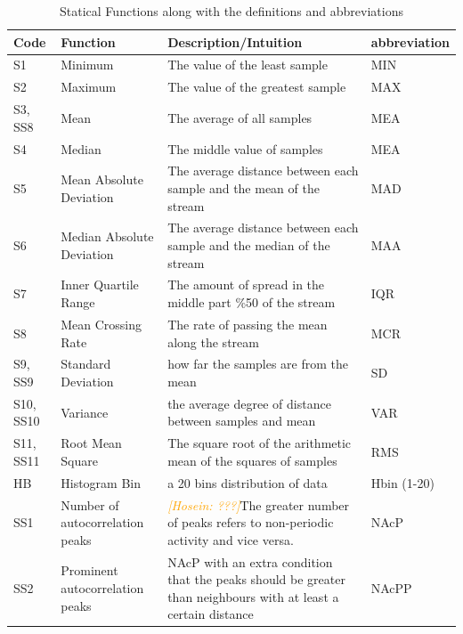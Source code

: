 \documentclass[journal,article,submit,moreauthors,pdftex]{Definitions/mdpi}
\newcommand{\hosein}[1]{\textcolor{orange}{{\it [Hosein: #1]}}}
\begin{document}
\begin{table}[H]
	\caption{Statical Functions along with the definitions and abbreviations }
	\centering
	\begin{tabular}{p{0.9cm}p{5cm}p{7cm}p{1.3cm}}
		\toprule
		\textbf{Code} & \textbf{Function} & \textbf{Description/Intuition} & \textbf{{\scriptsize abbreviation}} \\
		\midrule
		{\footnotesize S1}&Minimum & {\scriptsize The value of the least sample}& MIN\\
		S2&Maximum & {\scriptsize The value of the greatest sample}& MAX\\
		{\footnotesize S3, SS8}&Mean&  {\scriptsize The average of all samples}& MEA\\
		{\footnotesize S4}&Median&  {\scriptsize The middle value of samples}& MEA\\
		{\footnotesize S5}&{\footnotesize Mean Absolute Deviation}& {\scriptsize The average distance between each sample and the mean of the stream}& MAD\\
		{\footnotesize S6}&{\footnotesize Median Absolute Deviation}& {\scriptsize The average distance between each sample and the median of the stream}& MAA\\
		{\footnotesize S7}&Inner Quartile Range  & {\scriptsize The amount of spread in the middle part \%50 of the stream}& IQR\\
		{\footnotesize S8}&Mean Crossing Rate& {\scriptsize The rate of passing the mean along the stream}& MCR\\
		{\footnotesize S9, SS9}&Standard Deviation& {\scriptsize how far the samples are from the mean}& SD\\
		{\footnotesize S10, SS10}&Variance& {\scriptsize the average degree of distance between samples and mean}& VAR\\
		{\footnotesize S11, SS11}&Root Mean Square& {\scriptsize The square root of the arithmetic mean of the squares of samples}& RMS\\
		{\footnotesize HB}& Histogram Bin&{\scriptsize a 20 bins distribution of data } & Hbin (1-20) \\
		{\footnotesize SS1}&Number of autocorrelation peaks& {\scriptsize \hosein{???}The greater number of peaks refers to non-periodic activity and vice versa. }& NAcP\\
		{\footnotesize SS2}&Prominent autocorrelation peaks&{\scriptsize NAcP with an extra condition that the peaks should be greater than neighbours with at least a certain distance} & NAcPP \\

\end{tabular}
\end{table}
\end{document}

